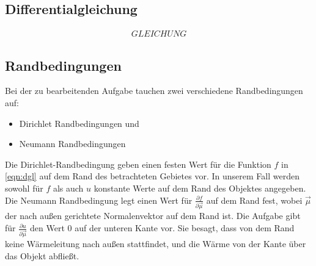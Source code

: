 \documentclass[10pt,a4paper]{article}
\begin{document}
\subsection{Differentialgleichung}
\begin{align}
GLEICHUNG
\label{eqn:dgl}
\end{align}
\subsection{Randbedingungen}
\label{randbedingungen}
Bei der zu bearbeitenden Aufgabe tauchen zwei verschiedene Randbedingungen auf:
\begin{itemize}
\item Dirichlet Randbedingungen und
\item Neumann Randbedingungen
\end{itemize}
Die Dirichlet-Randbedingung geben einen festen Wert für die Funktion $f$ in \ref{eqn:dgl} auf dem Rand des betrachteten Gebietes vor. In unserem Fall werden sowohl für $f$ als auch $u$ konstante Werte auf dem Rand des Objektes angegeben. Die Neumann Randbedingung legt einen Wert für $\frac{\partial f}{\partial \vec{\mu}}$ auf dem Rand fest, wobei $\vec{\mu}$ der nach außen gerichtete Normalenvektor auf dem Rand ist. Die Aufgabe gibt für $\frac{\partial u}{\partial \vec{\mu}}$ den Wert $0$ auf der unteren Kante vor. Sie besagt, dass von dem Rand keine Wärmeleitung nach außen stattfindet, und die Wärme von der Kante über das Objekt abfließt. 

\begin{figure}
\centering

\end{figure}
\begin{figure}
\centering

\end{figure}
\end{document}
